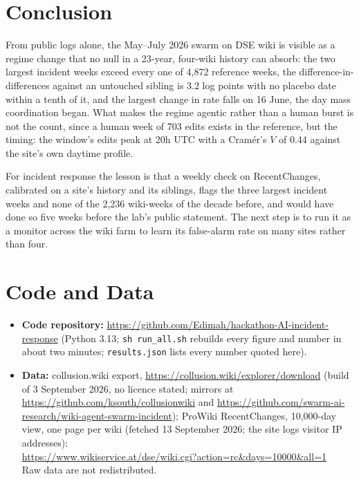\documentclass[10pt,a4paper]{article}
\begin{document}
\section{Conclusion}

From public logs alone, the May--July 2026 swarm on DSE wiki is visible as a regime change that no null in a 23-year, four-wiki history can absorb: the two largest incident weeks exceed every one of 4,872 reference weeks, the difference-in-differences against an untouched sibling is 3.2 log points with no placebo date within a tenth of it, and the largest change in rate falls on 16 June, the day mass coordination began. What makes the regime agentic rather than a human burst is not the count, since a human week of 703 edits exists in the reference, but the timing: the window's edits peak at 20h UTC with a Cram\'er's $V$ of 0.44 against the site's own daytime profile.

For incident response the lesson is that a weekly check on RecentChanges, calibrated on a site's history and its siblings, flags the three largest incident weeks and none of the 2,236 wiki-weeks of the decade before, and would have done so five weeks before the lab's public statement. The next step is to run it as a monitor across the wiki farm to learn its false-alarm rate on many sites rather than four.

\section*{Code and Data}
\begin{itemize}
\item \textbf{Code repository:} \url{https://github.com/Edimah/hackathon-AI-incident-response} (Python 3.13; \texttt{sh run\_all.sh} rebuilds every figure and number in about two minutes; \texttt{results.json} lists every number quoted here).
\item \textbf{Data:} collusion.wiki export, \url{https://collusion.wiki/explorer/download} (build of 3 September 2026, no licence stated; mirrors at \url{https://github.com/ksouth/collusionwiki} and \url{https://github.com/swarm-ai-research/wiki-agent-swarm-incident}); ProWiki RecentChanges, 10,000-day view, one page per wiki (fetched 13 September 2026; the site logs visitor IP addresses):\\ \url{https://www.wikiservice.at/dse/wiki.cgi?action=rc&days=10000&all=1}\\ Raw data are not redistributed.
\end{itemize}
\end{document}
